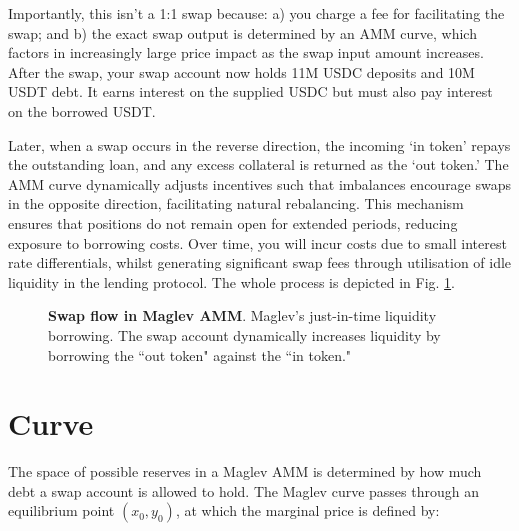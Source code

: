 \documentclass{article}
\begin{document}
\quad
Importantly, this isn’t a 1:1 swap because: a) you charge a fee for facilitating the swap; and b) the exact swap output is determined by an AMM curve, which factors in increasingly large price impact as the swap input amount increases. After the swap, your swap account now holds 11M USDC deposits and 10M USDT debt. It earns interest on the supplied USDC but must also pay interest on the borrowed USDT.

Later, when a swap occurs in the reverse direction, the incoming `in token' repays the outstanding loan, and any excess collateral is returned as the `out token.' The AMM curve dynamically adjusts incentives such that imbalances encourage swaps in the opposite direction, facilitating natural rebalancing. This mechanism ensures that positions do not remain open for extended periods, reducing exposure to borrowing costs. Over time, you will incur costs due to small interest rate differentials, whilst generating significant swap fees through utilisation of idle liquidity in the lending protocol. The whole process is depicted in Fig. \ref{fig:maglev_liquidity}.

\bigskip
\begin{figure}[h]
    \centering
    \caption{\textbf{Swap flow in Maglev AMM}. Maglev’s just-in-time liquidity borrowing. The swap account dynamically increases liquidity by borrowing the ``out token" against the ``in token."}
    \label{fig:maglev_liquidity}
\end{figure}

\section{Curve}

The space of possible reserves in a Maglev AMM is determined by how much debt a swap account is allowed to hold. The Maglev curve passes through an equilibrium point $(x_0, y_0)$, at which the marginal price is defined by:
\end{document}
